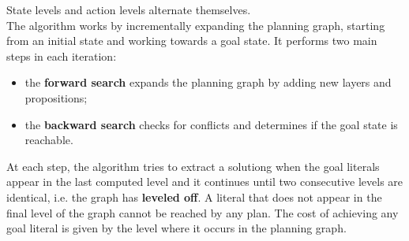 \documentclass{article}
\begin{document}
State levels and action levels alternate themselves. \\

The algorithm works by incrementally expanding the planning graph, starting from an initial state and working towards a goal state. It performs two main steps in each iteration: 

\begin{itemize}
    \item the \textbf{forward search} expands the planning graph by adding new layers and propositions;
    \item the \textbf{backward search} checks for conflicts and determines if the goal state is reachable.
\end{itemize}

At each step, the algorithm tries to extract a solutiong when the goal literals appear in the last computed level and it continues until two consecutive levels are identical, i.e. the graph has \textbf{leveled off}. A literal that does not appear in the final level of the graph cannot be reached by any plan. The cost of achieving any goal literal is given by the level where it occurs in the planning graph.

\vspace{2cm}

\begin{center}
\end{center}
\end{document}
